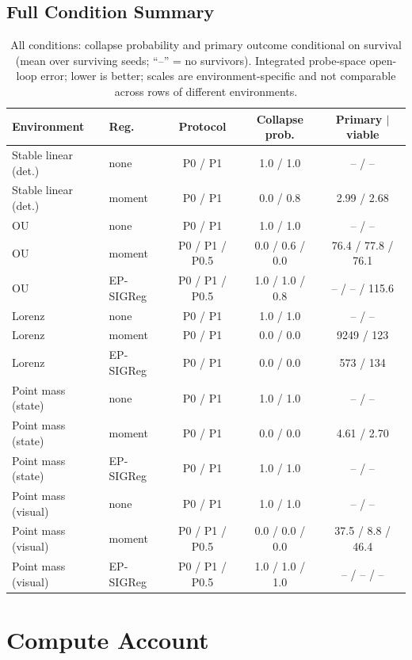 \subsection{Full Condition Summary}

\begin{table}[h]
\centering
\caption{All conditions: collapse probability and primary outcome conditional on survival (mean over surviving seeds; ``--'' = no survivors). Integrated probe-space open-loop error; lower is better; scales are environment-specific and not comparable across rows of different environments.}
\label{tab:full}
\small
\begin{tabular}{llccc}
\toprule
Environment & Reg. & Protocol & Collapse prob. & Primary $\mid$ viable \\
\midrule
Stable linear (det.) & none & P0 / P1 & 1.0 / 1.0 & -- / -- \\
Stable linear (det.) & moment & P0 / P1 & 0.0 / 0.8 & 2.99 / 2.68 \\
OU & none & P0 / P1 & 1.0 / 1.0 & -- / -- \\
OU & moment & P0 / P1 / P0.5 & 0.0 / 0.6 / 0.0 & 76.4 / 77.8 / 76.1 \\
OU & EP-SIGReg & P0 / P1 / P0.5 & 1.0 / 1.0 / 0.8 & -- / -- / 115.6 \\
Lorenz & none & P0 / P1 & 1.0 / 1.0 & -- / -- \\
Lorenz & moment & P0 / P1 & 0.0 / 0.0 & 9249 / 123 \\
Lorenz & EP-SIGReg & P0 / P1 & 0.0 / 0.0 & 573 / 134 \\
Point mass (state) & none & P0 / P1 & 1.0 / 1.0 & -- / -- \\
Point mass (state) & moment & P0 / P1 & 0.0 / 0.0 & 4.61 / 2.70 \\
Point mass (state) & EP-SIGReg & P0 / P1 & 1.0 / 1.0 & -- / -- \\
Point mass (visual) & none & P0 / P1 & 1.0 / 1.0 & -- / -- \\
Point mass (visual) & moment & P0 / P1 / P0.5 & 0.0 / 0.0 / 0.0 & 37.5 / 8.8 / 46.4 \\
Point mass (visual) & EP-SIGReg & P0 / P1 / P0.5 & 1.0 / 1.0 / 1.0 & -- / -- / -- \\
\bottomrule
\end{tabular}
\end{table}

\section{Compute Account}
\label{app:compute}

